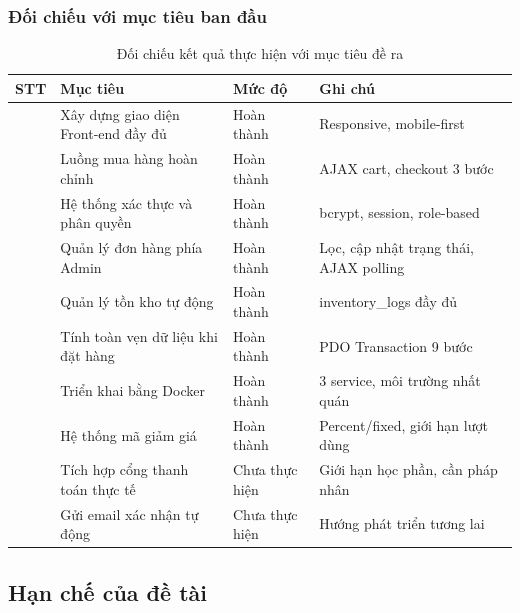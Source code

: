 \documentclass[11pt, a4paper]{article}
\begin{document}
\subsubsection{Đối chiếu với mục tiêu ban đầu}

\begin{table}[H]
    \centering
    \caption{Đối chiếu kết quả thực hiện với mục tiêu đề ra}
    \vspace{0.2cm}
    \begin{tabularx}{\linewidth}{|>{\centering\arraybackslash}p{0.8cm}
                                  |>{\raggedright\arraybackslash}p{5cm}
                                  |>{\centering\arraybackslash}p{2.2cm}
                                  |Y|}
        \hline
        \textbf{STT} & \textbf{Mục tiêu} & \textbf{Mức độ} & \textbf{Ghi chú} \\  & Xây dựng giao diện Front-end đầy đủ & Hoàn thành & Responsive, mobile-first \\  & Luồng mua hàng hoàn chỉnh & Hoàn thành & AJAX cart, checkout 3 bước \\  & Hệ thống xác thực và phân quyền & Hoàn thành & bcrypt, session, role-based \\  & Quản lý đơn hàng phía Admin & Hoàn thành & Lọc, cập nhật trạng thái, AJAX polling \\  & Quản lý tồn kho tự động & Hoàn thành & inventory\_logs đầy đủ \\  & Tính toàn vẹn dữ liệu khi đặt hàng & Hoàn thành & PDO Transaction 9 bước \\  & Triển khai bằng Docker & Hoàn thành & 3 service, môi trường nhất quán \\  & Hệ thống mã giảm giá & Hoàn thành & Percent/fixed, giới hạn lượt dùng \\  & Tích hợp cổng thanh toán thực tế & Chưa thực hiện & Giới hạn học phần, cần pháp nhân \\  & Gửi email xác nhận tự động & Chưa thực hiện & Hướng phát triển tương lai \\ \hline
    \end{tabularx}
\end{table}

\subsection{Hạn chế của đề tài}
\end{document}
